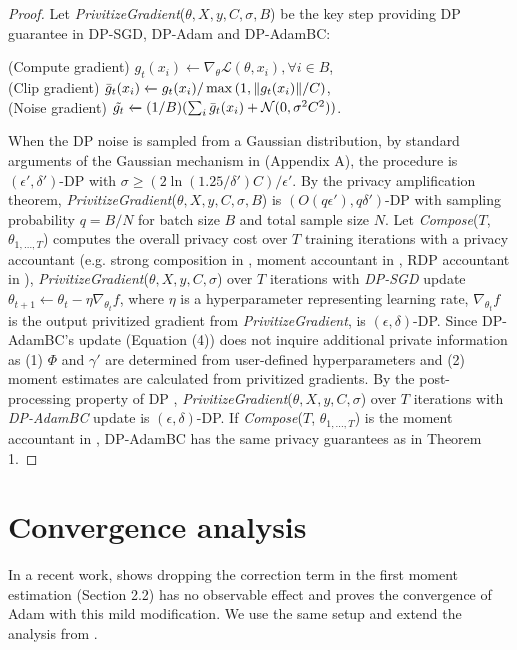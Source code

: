 \documentclass[letterpaper]{article} %
\begin{document}
\begin{proof}
    Let \textit{PrivitizeGradient}($\theta, X, y, C, \sigma, B$) be the key step providing DP guarantee in DP-SGD, DP-Adam and DP-AdamBC:
    \begin{center}
    (Compute gradient) $g_t(x_i) \xleftarrow{} \nabla_\theta \mathcal{L} (\theta, x_i), \forall i \in B$, \\
    (Clip gradient) $\Bar{g}_t(x_i) \xleftarrow{} g_t(x_i) / \max{(1, \lVert g_t(x_i) \rVert /C)}$, \\
    (Noise gradient) $\Tilde{g_t}\xleftarrow{} (1/B) (\sum_i \Bar{g}_t(x_i) + \mathcal{N}(0, \sigma^2 C^2))$.
    \end{center}
    When the DP noise is sampled from a Gaussian distribution, by standard arguments of the Gaussian mechanism in \citet{dwork2006calibrating} (Appendix A), the procedure is $(\epsilon', \delta')$-DP with $\sigma \geq (2\ln{(1.25/\delta')}C)/\epsilon'$. By the privacy amplification theorem, \textit{PrivitizeGradient}($\theta, X, y, C, \sigma, B$) is $(O(q\epsilon'), q\delta')$-DP with sampling probability $q=B/N$ for batch size $B$ and total sample size $N$. Let \textit{Compose}($T$, $\theta_{1,\ldots,T}$) computes the overall privacy cost over $T$ training iterations with a privacy accountant (e.g. strong composition in \citet{dwork2006calibrating}, moment accountant in \citet{abadi2016deep}, RDP accountant in \citet{Mironov_2019}), \textit{PrivitizeGradient}($\theta, X, y, C, \sigma$) over $T$ iterations with \textit{DP-SGD} update $\theta_{t+1} \xleftarrow{} \theta_{t} - \eta \nabla_{\theta_t} f$, where $\eta$ is a hyperparameter representing learning rate, $\nabla_{\theta_t} f$ is the output privitized gradient from \textit{PrivitizeGradient}, is $(\epsilon, \delta)$-DP. Since DP-AdamBC's update (Equation (4)) does not inquire additional private information as (1) $\Phi$ and $\gamma'$ are determined from user-defined hyperparameters and (2) moment estimates are calculated from privitized gradients. By the post-processing property of DP \citep{dwork2006calibrating}, \textit{PrivitizeGradient}($\theta, X, y, C, \sigma$) over $T$ iterations with \textit{DP-AdamBC} update is $(\epsilon, \delta)$-DP. If \textit{Compose}($T$, $\theta_{1,\ldots,T}$) is the moment accountant in \citet{abadi2016deep}, DP-AdamBC has the same privacy guarantees as in Theorem 1.
\end{proof}


\section{Convergence analysis}
\label{apdix:convergence_analysis}
In a recent work, \citet{défossez2022simple} shows dropping the correction term in the first moment estimation (Section 2.2) has no observable effect and proves the convergence of Adam with this mild modification. We use the same setup and extend the analysis from \citet{défossez2022simple}.
\end{document}
